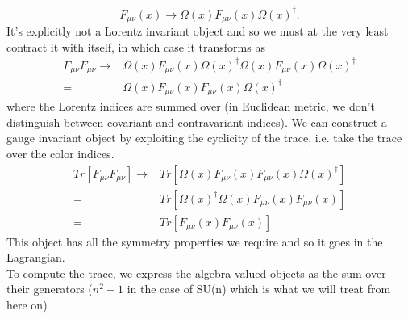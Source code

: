 \documentclass[a4paper,10pt]{article}
\begin{document}
\begin{equation}
F_{\mu \nu}(x) \rightarrow \Omega(x) F_{\mu \nu}(x) \Omega(x)^{\dagger}.
\end{equation}
It's explicitly not a Lorentz invariant object and so we must at the very least contract it with itself, in which case it transforms as 
\begin{equation}
\begin{aligned}
F_{\mu \nu}F_{\mu \nu} \rightarrow& \Omega(x) F_{\mu \nu}(x) \Omega(x)^{\dagger}\Omega(x) F_{\mu \nu}(x) \Omega(x)^{\dagger}\\
=&\Omega(x) F_{\mu \nu}(x) F_{\mu \nu}(x) \Omega(x)^{\dagger}
\end{aligned}
\end{equation}
where the Lorentz indices are summed over (in Euclidean metric, we don't distinguish between covariant and contravariant indices). We can construct a gauge invariant object by exploiting the cyclicity of the trace, i.e. take the trace over the color indices.
\begin{equation}
\begin{aligned}
Tr\left[F_{\mu \nu}F_{\mu \nu}\right] \rightarrow& Tr\left[\Omega(x) F_{\mu \nu}(x) F_{\mu \nu}(x) \Omega(x)^{\dagger}\right]\\
=&Tr\left[\Omega(x)^{\dagger}\Omega(x) F_{\mu \nu}(x) F_{\mu \nu}(x) \right]\\
=&Tr\left[F_{\mu \nu}(x) F_{\mu \nu}(x) \right]
\end{aligned}
\end{equation}
This object has all the symmetry properties we require and so it goes in the Lagrangian.\\To compute the trace, we express the algebra valued objects as the sum over their generators ($n^2-1$ in the case of SU(n) which is what we will treat from here on)
\end{document}
